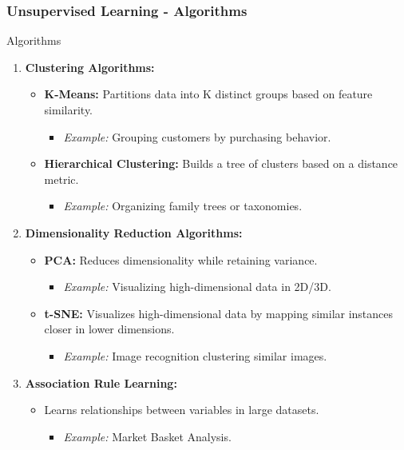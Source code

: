 \documentclass[aspectratio=169]{beamer}
\begin{document}
\begin{frame}[fragile]
  \frametitle{Unsupervised Learning - Algorithms}
  \begin{block}{Algorithms}
    \begin{enumerate}
      \item \textbf{Clustering Algorithms:}
        \begin{itemize}
          \item \textbf{K-Means:} Partitions data into K distinct groups based on feature similarity.
            \begin{itemize}
              \item \textit{Example:} Grouping customers by purchasing behavior.
            \end{itemize}
          \item \textbf{Hierarchical Clustering:} Builds a tree of clusters based on a distance metric.
            \begin{itemize}
              \item \textit{Example:} Organizing family trees or taxonomies.
            \end{itemize}
        \end{itemize}
      \item \textbf{Dimensionality Reduction Algorithms:}
        \begin{itemize}
          \item \textbf{PCA:} Reduces dimensionality while retaining variance.
            \begin{itemize}
              \item \textit{Example:} Visualizing high-dimensional data in 2D/3D.
            \end{itemize}
          \item \textbf{t-SNE:} Visualizes high-dimensional data by mapping similar instances closer in lower dimensions.
            \begin{itemize}
              \item \textit{Example:} Image recognition clustering similar images.
            \end{itemize}
        \end{itemize}
      \item \textbf{Association Rule Learning:}
        \begin{itemize}
          \item Learns relationships between variables in large datasets. 
            \begin{itemize}
              \item \textit{Example:} Market Basket Analysis.
            \end{itemize}
        \end{itemize}
    \end{enumerate}
  \end{block}
\end{frame}
\end{document}
